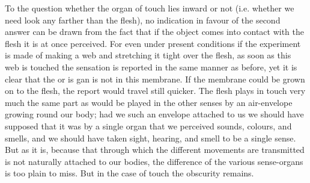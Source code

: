 To the question whether the organ of touch lies inward or not (i.e.
whether we need look any farther than the flesh), no indication in
favour of the second answer can be drawn from the fact that if the
object comes into contact with the flesh it is at once perceived.
For even under present conditions if the experiment is made of making
a web and stretching it tight over the flesh, as soon as this web
is touched the sensation is reported in the same manner as before,
yet it is clear that the or is gan is not in this membrane. If the
membrane could be grown on to the flesh, the report would travel still
quicker. The flesh plays in touch very much the same part as would
be played in the other senses by an air-envelope growing round our
body; had we such an envelope attached to us we should have supposed
that it was by a single organ that we perceived sounds, colours, and
smells, and we should have taken sight, hearing, and smell to be a
single sense. But as it is, because that through which the different
movements are transmitted is not naturally attached to our bodies,
the difference of the various sense-organs is too plain to miss. But
in the case of touch the obscurity remains. 

